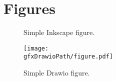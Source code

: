 \documentclass[main.tex]{subfiles}
\begin{document}
\section{Figures}

\begin{figure}[h]
  \begin{center}
  \end{center}
  \caption{Simple Inkscape figure.}
\end{figure}

\begin{figure}[h]
  \center
  \texttt{[image: \\gfxDrawioPath/figure.pdf]}
  \caption{Simple Drawio figure.}
\end{figure}
\end{document}

